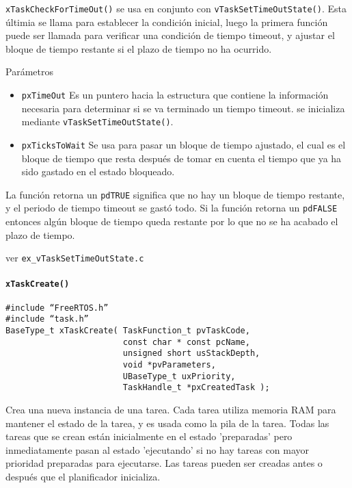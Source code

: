 \texttt{xTaskCheckForTimeOut()} se usa en conjunto con \texttt{vTaskSetTimeOutState()}. Esta últimia se llama para establecer la condición inicial, luego la primera función puede ser llamada para verificar una condición de tiempo timeout, y ajustar el bloque de tiempo restante si el plazo de tiempo no ha ocurrido.

Parámetros 

\begin{itemize}
    \item \texttt{pxTimeOut} Es un puntero hacia la estructura que contiene la información necesaria para determinar si se va terminado un tiempo timeout. se inicializa mediante \texttt{vTaskSetTimeOutState()}.
    \item \texttt{pxTicksToWait} Se usa para pasar un bloque de tiempo ajustado, el cual es el bloque de tiempo que resta después de tomar en cuenta el tiempo que ya ha sido gastado en el estado bloqueado.
\end{itemize}

La función retorna un \texttt{pdTRUE} significa que no hay un bloque de tiempo restante, y el periodo de tiempo timeout se gastó todo. Si la función retorna un \texttt{pdFALSE} entonces algún bloque de tiempo queda restante por lo que no se ha acabado el plazo de tiempo.

ver \texttt{ex\_vTaskSetTimeOutState.c}

\paragraph{\texttt{xTaskCreate()}}

\begin{verbatim}
#include “FreeRTOS.h”
#include “task.h”
BaseType_t xTaskCreate( TaskFunction_t pvTaskCode,
                        const char * const pcName,  
                        unsigned short usStackDepth,
                        void *pvParameters,
                        UBaseType_t uxPriority,
                        TaskHandle_t *pxCreatedTask );
\end{verbatim}

Crea una nueva instancia de una tarea. Cada tarea utiliza memoria RAM para mantener el estado de la tarea, y es usada como la pila de la tarea. Todas las tareas que se crean están inicialmente en el estado 'preparadas' pero inmediatamente pasan al estado 'ejecutando' si no hay tareas con mayor prioridad preparadas para ejecutarse. Las tareas pueden ser creadas antes o después que el planificador inicializa.\\

